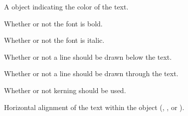 \documentclass[letterpaper,10pt,english]{sphinxmanual}
\begin{document}
\begin{fulllineitems}

\begin{fulllineitems}
\label{index:tmx.Text.color}
A {\hyperref[index:tmx.Color]{\emph{}}} object indicating the color of the text.

\end{fulllineitems}


\begin{fulllineitems}
\label{index:tmx.Text.bold}
Whether or not the font is bold.

\end{fulllineitems}


\begin{fulllineitems}
\label{index:tmx.Text.italic}
Whether or not the font is italic.

\end{fulllineitems}


\begin{fulllineitems}
\label{index:tmx.Text.underline}
Whether or not a line should be drawn below the text.

\end{fulllineitems}


\begin{fulllineitems}
\label{index:tmx.Text.strikeout}
Whether or not a line should be drawn through the text.

\end{fulllineitems}


\begin{fulllineitems}
\label{index:tmx.Text.kerning}
Whether or not kerning should be used.

\end{fulllineitems}


\begin{fulllineitems}
\label{index:tmx.Text.halign}
Horizontal alignment of the text within the object (,
, or ).


\end{fulllineitems}
\end{fulllineitems}
\end{document}
